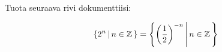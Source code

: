     \begin{harj}
        Tuota seuraava rivi dokumenttiisi:
        \begin{sample}
            \[
                \left\lbrace 2^n \,\middle|\, n\in\mathbb{Z}\,\right\rbrace=\left\lbrace \left(\frac{1}{2}\right)^{-n}\,\middle|\, n\in\mathbb{Z}\,\right\rbrace
            \]
        \end{sample}
    \end{harj}

